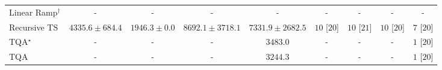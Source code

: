 \begin{tabular}{l|cccc|cccc|}
Linear Ramp$^\dagger$ & {\cellcolor[HTML]{000000}} \color[HTML]{F1F1F1} {\cellcolor{white}} \color{black} - & {\cellcolor[HTML]{000000}} \color[HTML]{F1F1F1} {\cellcolor{white}} \color{black} - & {\cellcolor[HTML]{000000}} \color[HTML]{F1F1F1} {\cellcolor{white}} \color{black} - & {\cellcolor[HTML]{000000}} \color[HTML]{F1F1F1} {\cellcolor{white}} \color{black} - & {\cellcolor[HTML]{000000}} \color[HTML]{F1F1F1} {\cellcolor{white}} \color{black} - & {\cellcolor[HTML]{000000}} \color[HTML]{F1F1F1} {\cellcolor{white}} \color{black} - & {\cellcolor[HTML]{000000}} \color[HTML]{F1F1F1} {\cellcolor{white}} \color{black} - & {\cellcolor[HTML]{000000}} \color[HTML]{F1F1F1} {\cellcolor{white}} \color{black} - \\
Recursive TS & {\cellcolor[HTML]{A7BDDB}} \color[HTML]{000000} $4335.6\pm 684.4$ & {\cellcolor[HTML]{F8F1F8}} \color[HTML]{000000} $1946.3\pm 0.0$ & {\cellcolor[HTML]{034267}} \color[HTML]{F1F1F1} $8692.1\pm 3718.1$ & {\cellcolor[HTML]{056BA7}} \color[HTML]{F1F1F1} $7331.9\pm 2682.5$ & {\cellcolor[HTML]{49006A}} \color[HTML]{F1F1F1} $10$ [$20$] & {\cellcolor[HTML]{49006A}} \color[HTML]{F1F1F1} $10$ [$21$] & {\cellcolor[HTML]{49006A}} \color[HTML]{F1F1F1} $10$ [$20$] & {\cellcolor[HTML]{CD238F}} \color[HTML]{F1F1F1} $7$ [$20$] \\
TQA$^\star$ & {\cellcolor[HTML]{000000}} \color[HTML]{F1F1F1} {\cellcolor{white}} \color{black} - & {\cellcolor[HTML]{000000}} \color[HTML]{F1F1F1} {\cellcolor{white}} \color{black} - & {\cellcolor[HTML]{000000}} \color[HTML]{F1F1F1} {\cellcolor{white}} \color{black} - & {\cellcolor[HTML]{CDD0E5}} \color[HTML]{000000} $3483.0$ & {\cellcolor[HTML]{000000}} \color[HTML]{F1F1F1} {\cellcolor{white}} \color{black} - & {\cellcolor[HTML]{000000}} \color[HTML]{F1F1F1} {\cellcolor{white}} \color{black} - & {\cellcolor[HTML]{000000}} \color[HTML]{F1F1F1} {\cellcolor{white}} \color{black} - & {\cellcolor[HTML]{FFF7F3}} \color[HTML]{000000} $1$ [$20$] \\
TQA & {\cellcolor[HTML]{000000}} \color[HTML]{F1F1F1} {\cellcolor{white}} \color{black} - & {\cellcolor[HTML]{000000}} \color[HTML]{F1F1F1} {\cellcolor{white}} \color{black} - & {\cellcolor[HTML]{000000}} \color[HTML]{F1F1F1} {\cellcolor{white}} \color{black} - & {\cellcolor[HTML]{D6D6E9}} \color[HTML]{000000} $3244.3$ & {\cellcolor[HTML]{000000}} \color[HTML]{F1F1F1} {\cellcolor{white}} \color{black} - & {\cellcolor[HTML]{000000}} \color[HTML]{F1F1F1} {\cellcolor{white}} \color{black} - & {\cellcolor[HTML]{000000}} \color[HTML]{F1F1F1} {\cellcolor{white}} \color{black} - & {\cellcolor[HTML]{FFF7F3}} \color[HTML]{000000} $1$ [$20$] \\
\cline{1-9}
\bottomrule
\end{tabular}
